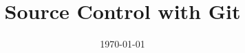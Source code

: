 \documentclass{beamer}
\title{Source Control with Git}
\date{\today}
\begin{document}
\begin{frame}
\titlepage
\end{frame}
\end{document}
